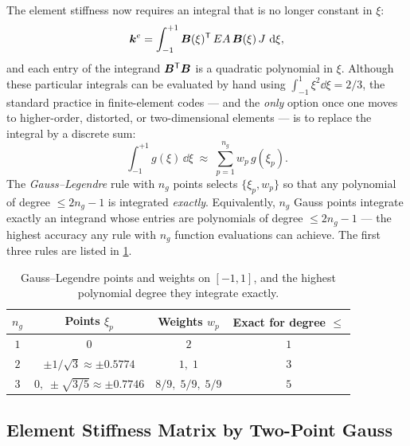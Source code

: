 The element stiffness now requires an integral that is no longer
constant in $\xi$:
\begin{equation}
    \bm{k}^e
    = \int_{-1}^{+1} \bm{B}(\xi)^{\mathsf{T}}\,EA\,\bm{B}(\xi)\,J\,\,\mathrm{d}\xi ,
\end{equation}
and each entry of the integrand $\bm{B}^{\mathsf{T}}\bm{B}$ is a
quadratic polynomial in $\xi$. Although these particular integrals can
be evaluated by hand using $\int_{-1}^{1}\xi^2\dd\xi = 2/3$, the standard
practice in finite-element codes --- and the \emph{only} option once one
moves to higher-order, distorted, or two-dimensional elements --- is to
replace the integral by a discrete sum:
\begin{equation}
    \int_{-1}^{+1} g(\xi)\,\dd\xi \;\approx\;
    \sum_{p=1}^{n_g} w_p\,g(\xi_p) .
    \label{eq:gauss_rule}
\end{equation}
The \emph{Gauss--Legendre} rule with $n_g$ points selects $\{\xi_p,w_p\}$
so that any polynomial of degree $\leq 2n_g - 1$ is integrated
\emph{exactly}. Equivalently, $n_g$ Gauss points integrate exactly an
integrand whose entries are polynomials of degree $\leq 2n_g - 1$ ---
the highest accuracy any rule with $n_g$ function evaluations can
achieve. The first three rules are listed in \cref{tab:gauss_1d}.

\begin{table}[htbp]
\centering
\small
\caption{Gauss--Legendre points and weights on $[-1,1]$, and the highest
polynomial degree they integrate exactly.}
\label{tab:gauss_1d}
\begin{tabular}{@{}cccc@{}}
\toprule
$n_g$ & Points $\xi_p$ & Weights $w_p$ & Exact for degree $\leq$ \\
\midrule
$1$ & $0$                                              & $2$            & $1$ \\
$2$ & $\pm 1/\sqrt{3} \approx \pm 0.5774$              & $1,\;1$        & $3$ \\
$3$ & $0,\; \pm\sqrt{3/5} \approx \pm 0.7746$          & $8/9,\;5/9,\;5/9$ & $5$ \\
\bottomrule
\end{tabular}
\end{table}

\subsection{Element Stiffness Matrix by Two-Point Gauss}
\label{sec:bar_ke_quad}

